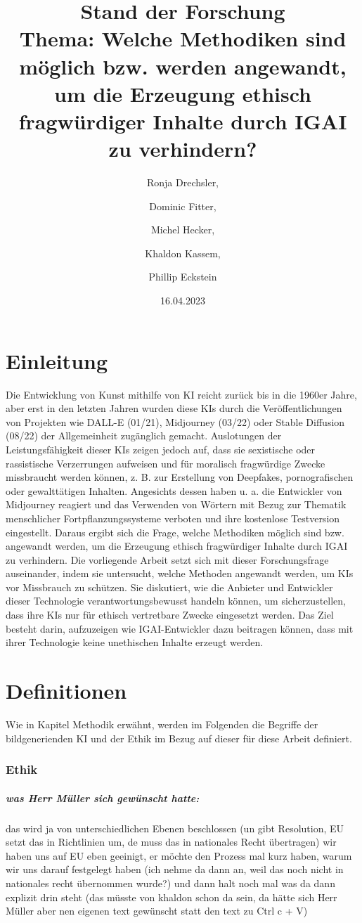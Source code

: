 \documentclass[12pt]{article}
\title{Stand der Forschung \\[1ex] \large Thema: Welche Methodiken sind möglich bzw. werden angewandt, um die Erzeugung ethisch fragwürdiger Inhalte durch IGAI zu verhindern?}
\date{16.04.2023}
\author{Ronja Drechsler, \and Dominic Fitter, \and Michel Hecker, \and Khaldon Kassem, \and Phillip Eckstein}
\begin{document}
\maketitle
\tableofcontents
\newpage

\chapter{Einleitung}

Die Entwicklung von Kunst mithilfe von KI reicht zurück bis in die 1960er Jahre\cite{Garcia}, aber erst in den letzten Jahren wurden diese KIs durch die Veröffentlichungen von Projekten wie DALL-E (01/21), Midjourney (03/22) oder Stable Diffusion (08/22) der Allgemeinheit zugänglich gemacht. Auslotungen der Leistungsfähigkeit dieser KIs zeigen jedoch auf, dass sie sexistische oder rassistische Verzerrungen aufweisen \cite{Schmidt}und für moralisch fragwürdige Zwecke missbraucht werden können, z. B. zur Erstellung von Deepfakes, pornografischen oder gewalttätigen Inhalten.\cite{Hadero}
Angesichts dessen haben u. a. die Entwickler von Midjourney reagiert und das Verwenden von Wörtern mit Bezug zur Thematik menschlicher Fortpflanzungssysteme verboten \cite{Heikkilae} und ihre kostenlose Testversion eingestellt. \cite{NelsonMidjourney} Daraus ergibt sich die Frage, welche Methodiken möglich sind bzw. angewandt werden, um die Erzeugung ethisch fragwürdiger Inhalte durch IGAI zu verhindern. 
Die vorliegende Arbeit setzt sich mit dieser Forschungsfrage auseinander, indem sie untersucht, welche Methoden angewandt werden, um KIs vor Missbrauch zu schützen. Sie diskutiert, wie die Anbieter und Entwickler dieser Technologie verantwortungsbewusst handeln können, um sicherzustellen, dass ihre KIs nur für ethisch vertretbare Zwecke eingesetzt werden. Das Ziel besteht darin, aufzuzeigen wie IGAI-Entwickler dazu beitragen können, dass mit ihrer Technologie keine unethischen Inhalte erzeugt werden.

 

\chapter{Definitionen}
Wie in Kapitel Methodik erwähnt, werden im Folgenden die Begriffe der bildgenerienden KI und der Ethik im Bezug auf dieser für diese Arbeit definiert.
\subsection{Ethik}
\paragraph{was Herr Müller sich gewünscht hatte:}
das wird ja von unterschiedlichen Ebenen beschlossen (un gibt Resolution, EU setzt das in Richtlinien um, de muss das in nationales Recht übertragen) wir haben uns auf EU eben geeinigt, er möchte den Prozess mal kurz haben, warum wir uns darauf festgelegt haben (ich nehme da dann an, weil das noch nicht in nationales recht übernommen wurde?) und dann halt noch mal was da dann explizit drin steht (das müsste von khaldon schon da sein, da hätte sich Herr Müller aber nen eigenen text gewünscht statt den text zu Ctrl c + V)
\end{document}
